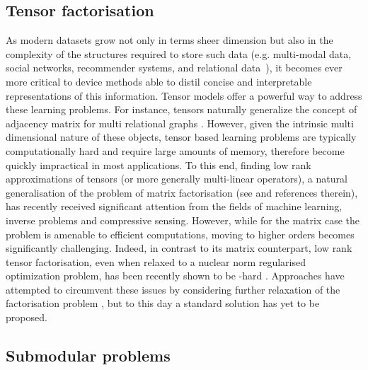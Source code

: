 \documentclass[a4paper, 11pt]{article}
\begin{document}
\subsection*{Tensor factorisation} 
As modern datasets grow not only in terms sheer dimension but also in the complexity of the structures required to store such data (e.g. multi-modal data, social networks, recommender systems, and relational data~\cite{suchanek2007yago,dong2014knowledge,carlson2010toward}), it becomes ever more critical to device methods able to distil concise and interpretable representations of this information. Tensor models offer a powerful way to address these learning problems. For instance, tensors naturally generalize the concept of adjacency matrix for multi relational graphs \cite{getoor2007introduction}. However, given the intrinsic multi dimensional nature of these objects, tensor based learning problems are typically computationally hard and require large amounts of memory, therefore become quickly impractical in most applications. To this end, finding low rank approximations of tensors (or more generally multi-linear operators), a natural generalisation of the problem of matrix factorisation (see \cite{kolda2009tensor} and references therein), has recently received significant attention from the fields of machine learning, inverse problems and compressive sensing. However, while for the matrix case the problem is amenable to efficient computations, moving to higher orders becomes significantly challenging. Indeed, in contrast to its matrix counterpart, low rank tensor factorisation, even when relaxed to a nuclear norm regularised optimization problem, has been recently shown to be \NP-hard \cite{hillar2013most}. Approaches have attempted to circumvent these issues by considering further relaxation of the factorisation problem \cite{mu2014square,richard2014statistical,romera2013new,romera2013multilinear,signoretto2014learning,gandy2011tensor}, but to this day a standard solution has yet to be proposed.


\subsection*{Submodular problems} 
\end{document}
